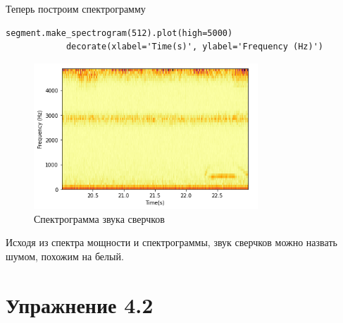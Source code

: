 \documentclass[a4paper,12pt]{article}
\begin{document}
\begin{enumerate}
		Теперь построим спектрограмму
		\begin{lstlisting}[caption=Построение спектрограммы звука сверчков]
			segment.make_spectrogram(512).plot(high=5000)
			decorate(xlabel='Time(s)', ylabel='Frequency (Hz)')
		\end{lstlisting}
		\begin{figure}[H]
			\centering
			\includegraphics[width=0.75\textwidth]{1_6.png}
			\caption{Спектрограмма звука сверчков}
			\label{fig:1.5}
		\end{figure}
		
		Исходя из спектра мощности и спектрограммы, звук сверчков можно назвать шумом, похожим на белый.
		
	\end{enumerate}
	\newpage
	
	
	\section{Упражнение 4.2}
	
\end{document}
